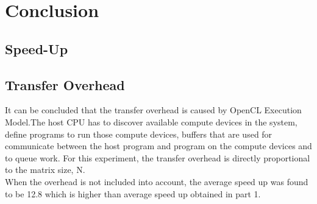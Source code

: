 \section{Conclusion}

\subsection{Speed-Up}

\subsection{Transfer Overhead}

It can be concluded that the transfer overhead is caused by OpenCL Execution Model.The host CPU has to discover available compute devices in the system, define programs to run those compute devices, buffers that are used for communicate between the host program and program on the compute devices and to queue work. For this experiment, the transfer overhead is directly proportional to the matrix size, N.
\\
When the overhead is not included into account, the average speed up was found to be 12.8 which is higher than average speed up obtained in part 1.